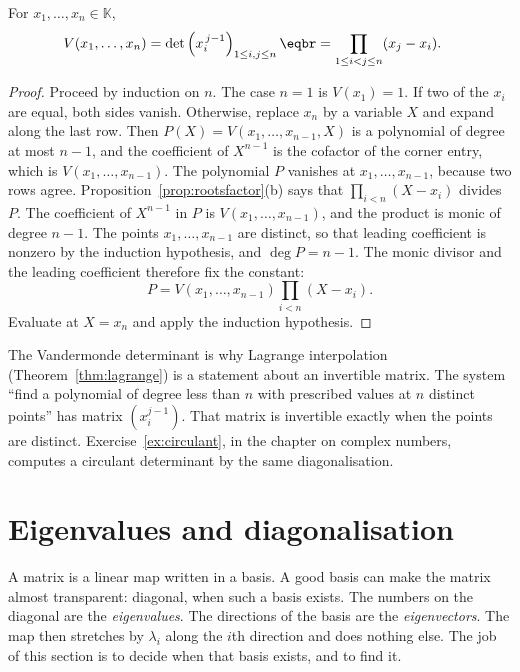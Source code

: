 \begin{proposition}[Vandermonde]\label{prop:vdm}
For $x_1,\dots,x_n\in\mathbb K$,
\[
\begin{aligned}V(x_1,\dots,x_n)&=\det\left(x_i^{\,j-1}\right)_{1\le i,j\le n}\eqbr=\prod_{1\le i<j\le n}(x_j-x_i).\end{aligned}
\]
\end{proposition}
\begin{proof}
Proceed by induction on $n$. The case $n=1$ is $V(x_1)=1$. If two of the $x_i$ are equal, both sides vanish. Otherwise, replace $x_n$ by a variable $X$ and expand along the last row. Then $P(X)=V(x_1,\dots,x_{n-1},X)$ is a polynomial of degree at most $n-1$, and the coefficient of $X^{n-1}$ is the cofactor of the corner entry, which is $V(x_1,\dots,x_{n-1})$. The polynomial $P$ vanishes at $x_1,\dots,x_{n-1}$, because two rows agree. Proposition~\ref{prop:rootsfactor}(b) says that $\prod_{i<n}(X-x_i)$ divides $P$. The coefficient of $X^{n-1}$ in $P$ is $V(x_1,\dots,x_{n-1})$, and the product is monic of degree $n-1$. The points $x_1,\dots,x_{n-1}$ are distinct, so that leading coefficient is nonzero by the induction hypothesis, and $\deg P=n-1$. The monic divisor and the leading coefficient therefore fix the constant:
\[
P=V(x_1,\dots,x_{n-1})\prod_{i<n}(X-x_i).
\]
Evaluate at $X=x_n$ and apply the induction hypothesis.
\end{proof}


The Vandermonde determinant is why Lagrange interpolation (Theorem~\ref{thm:lagrange}) is a statement about an invertible matrix. The system ``find a polynomial of degree less than $n$ with prescribed values at $n$ distinct points'' has matrix $(x_i^{j-1})$. That matrix is invertible exactly when the points are distinct. Exercise~\ref{ex:circulant}, in the chapter on complex numbers, computes a circulant determinant by the same diagonalisation.

\section{Eigenvalues and diagonalisation}

A matrix is a linear map written in a basis. A good basis can make the matrix almost transparent: diagonal, when such a basis exists. The numbers on the diagonal are the \emph{eigenvalues}. The directions of the basis are the \emph{eigenvectors}. The map then stretches by $\lambda_i$ along the $i$th direction and does nothing else. The job of this section is to decide when that basis exists, and to find it.

